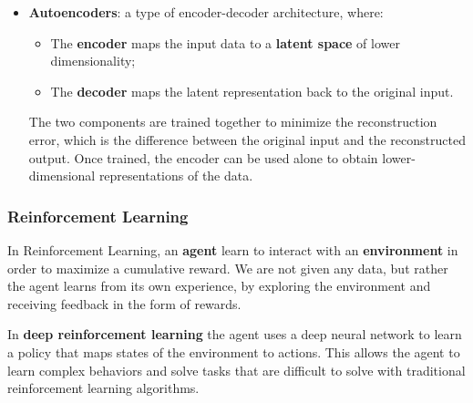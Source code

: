\begin{itemize}
    \item \textbf{Autoencoders}: a type of encoder-decoder architecture, where:
    \begin{itemize}
        \item The \textbf{encoder} maps the input data to a \textbf{latent space} of lower dimensionality;
        \item The \textbf{decoder} maps the latent representation back to the original input.
    \end{itemize}
    The two components are trained together to minimize the reconstruction error, which is the difference between the original input and the reconstructed output.
    Once trained, the encoder can be used alone to obtain lower-dimensional representations of the data.
\end{itemize}

\subsubsection{Reinforcement Learning}
In Reinforcement Learning, an \textbf{agent} learn to interact with an \textbf{environment} in order to maximize a cumulative reward.
We are not given any data, but rather the agent learns from its own experience, by exploring the environment and receiving feedback in the form of rewards.

In \textbf{deep reinforcement learning} the agent uses a deep neural network to learn a policy that maps states of the environment to actions. 
This allows the agent to learn complex behaviors and solve tasks that are difficult to solve with traditional reinforcement learning algorithms.

